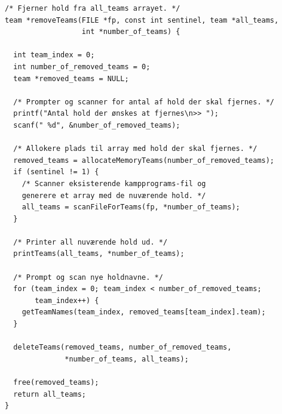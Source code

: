 \begin{listing}[H]
\begin{verbatim}
/* Fjerner hold fra all_teams arrayet. */
team *removeTeams(FILE *fp, const int sentinel, team *all_teams, 
                  int *number_of_teams) {
                  
  int team_index = 0;
  int number_of_removed_teams = 0;
  team *removed_teams = NULL;

  /* Prompter og scanner for antal af hold der skal fjernes. */
  printf("Antal hold der ønskes at fjernes\n>> ");
  scanf(" %d", &number_of_removed_teams);

  /* Allokere plads til array med hold der skal fjernes. */
  removed_teams = allocateMemoryTeams(number_of_removed_teams);
  if (sentinel != 1) {
    /* Scanner eksisterende kampprograms-fil og 
    generere et array med de nuværende hold. */
    all_teams = scanFileForTeams(fp, *number_of_teams);
  }

  /* Printer all nuværende hold ud. */
  printTeams(all_teams, *number_of_teams);

  /* Prompt og scan nye holdnavne. */
  for (team_index = 0; team_index < number_of_removed_teams; 
       team_index++) {
    getTeamNames(team_index, removed_teams[team_index].team);
  }

  deleteTeams(removed_teams, number_of_removed_teams, 
              *number_of_teams, all_teams);
              
  free(removed_teams);
  return all_teams;
}
\end{verbatim}
\label{code:removeTeams}
\end{listing}

